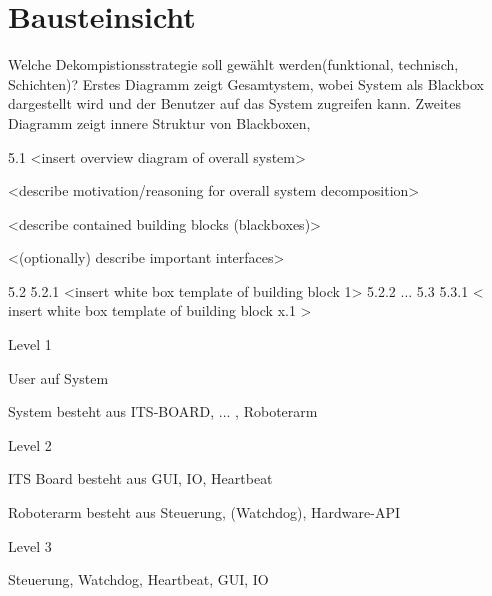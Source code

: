 \chapter{Bausteinsicht}

Welche Dekompistionsstrategie soll gewählt werden(funktional, technisch, Schichten)?
Erstes Diagramm zeigt  Gesamtystem, wobei System als Blackbox dargestellt wird und der Benutzer auf das System zugreifen kann. 
Zweites Diagramm zeigt innere Struktur von Blackboxen, 






5.1 
    <insert overview diagram of overall system>

    <describe motivation/reasoning for overall system decomposition>

    <describe contained building blocks (blackboxes)>

    <(optionally) describe important interfaces>

5.2 
    5.2.1 
        <insert white box template of building block 1>
    5.2.2
        ...
5.3
    5.3.1 
        < insert white box template of building block x.1 >



Level 1 

User auf System 

System besteht aus ITS-BOARD, ... , Roboterarm 

Level 2

ITS Board besteht aus GUI, IO, Heartbeat

Roboterarm besteht aus Steuerung, (Watchdog),  Hardware-API

Level 3

Steuerung, Watchdog, Heartbeat, GUI, IO